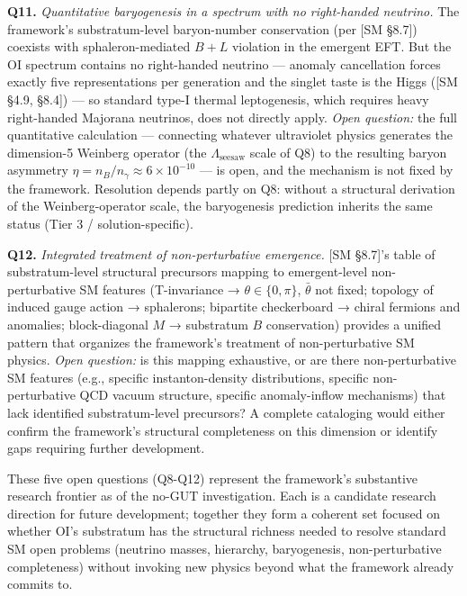 \documentclass[
]{article}
\begin{document}
\textbf{Q11.} \emph{Quantitative baryogenesis in a spectrum with no
right-handed neutrino.} The framework's substratum-level baryon-number
conservation (per {[}SM §8.7{]}) coexists with sphaleron-mediated
\(B+L\) violation in the emergent EFT. But the OI spectrum contains no
right-handed neutrino --- anomaly cancellation forces exactly five
representations per generation and the singlet taste is the Higgs ({[}SM
§4.9, §8.4{]}) --- so standard type-I thermal leptogenesis, which
requires heavy right-handed Majorana neutrinos, does not directly apply.
\emph{Open question:} the full quantitative calculation --- connecting
whatever ultraviolet physics generates the dimension-5 Weinberg operator
(the \(\Lambda_{\mathrm{seesaw}}\) scale of Q8) to the resulting baryon
asymmetry \(\eta = n_B/n_\gamma \approx 6 \times 10^{-10}\) --- is open,
and the mechanism is not fixed by the framework. Resolution depends
partly on Q8: without a structural derivation of the Weinberg-operator
scale, the baryogenesis prediction inherits the same status (Tier 3 /
solution-specific).

\textbf{Q12.} \emph{Integrated treatment of non-perturbative emergence.}
{[}SM §8.7{]}'s table of substratum-level structural precursors mapping
to emergent-level non-perturbative SM features (T-invariance →
\(\theta \in \{0,\pi\}\), \(\bar\theta\) not fixed; topology of induced
gauge action → sphalerons; bipartite checkerboard → chiral fermions and
anomalies; block-diagonal \(M\) → substratum \(B\) conservation)
provides a unified pattern that organizes the framework's treatment of
non-perturbative SM physics. \emph{Open question:} is this mapping
exhaustive, or are there non-perturbative SM features (e.g., specific
instanton-density distributions, specific non-perturbative QCD vacuum
structure, specific anomaly-inflow mechanisms) that lack identified
substratum-level precursors? A complete cataloging would either confirm
the framework's structural completeness on this dimension or identify
gaps requiring further development.

These five open questions (Q8-Q12) represent the framework's substantive
research frontier as of the no-GUT investigation. Each is a candidate
research direction for future development; together they form a coherent
set focused on whether OI's substratum has the structural richness
needed to resolve standard SM open problems (neutrino masses, hierarchy,
baryogenesis, non-perturbative completeness) without invoking new
physics beyond what the framework already commits to.
\end{document}
